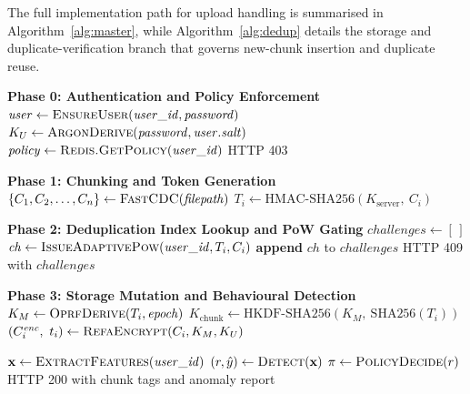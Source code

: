 \documentclass[12pt,a4paper,oneside]{report}
\newcommand{\KS}{K_{\mathrm{server}}}
\newcommand{\KM}{K_M}
\newcommand{\Kchunk}{K_{\mathrm{chunk}}}
\newcommand{\HMAC}{\mathrm{HMAC\text{-}SHA256}}
\newcommand{\HKDF}{\mathrm{HKDF\text{-}SHA256}}
\begin{document}
The full implementation path for upload handling is summarised in Algorithm~\ref{alg:master}, while Algorithm~\ref{alg:dedup} details the storage and duplicate-verification branch that governs new-chunk insertion and duplicate reuse.

\begin{algorithm}[H]
\caption{Master Upload Procedure — \textsc{SecureDedupSystem.Upload}}
\label{alg:master}
\begin{algorithmic}[1]
  \State \textbf{Phase 0: Authentication and Policy Enforcement}
  \State $\mathit{user} \gets \Call{EnsureUser}{\mathit{user\_id}, \mathit{password}}$
  \State $K_U \gets \Call{ArgonDerive}{\mathit{password}, \mathit{user.salt}}$
  \State $\mathit{policy} \gets \Call{Redis.GetPolicy}{\mathit{user\_id}}$
    \State \Return \textsc{HTTP 403}
    \State {}
  \EndIf

  \State \textbf{Phase 1: Chunking and Token Generation}
  \State $\{C_1, C_2, \ldots, C_n\} \gets \Call{FastCDC}{\mathit{filepath}}$
    \State $T_i \gets \HMAC(\KS,\ C_i)$
  \EndFor

  \State \textbf{Phase 2: Deduplication Index Lookup and PoW Gating}
  \State $\mathit{challenges} \gets [\,]$
        \State $\mathit{ch} \gets \Call{IssueAdaptivePow}{\mathit{user\_id}, T_i, C_i}$
        \State \textbf{append} $\mathit{ch}$ to $\mathit{challenges}$
      \EndIf
    \EndIf
  \EndFor
    \State \Return \textsc{HTTP 409} with $\mathit{challenges}$
  \EndIf

  \State \textbf{Phase 3: Storage Mutation and Behavioural Detection}
      \State $\KM \gets \Call{OprfDerive}{T_i, \mathit{epoch}}$
      \State $\Kchunk \gets \HKDF(\KM,\ \mathrm{SHA256}(T_i))$
      \State $(C_i^{\mathit{enc}},\ t_i) \gets \Call{RefaEncrypt}{C_i, \KM, K_U}$
      \State {}
      \State {}
      \State {}
    \Else
      \State {}
        \State {}
      \EndIf
    \EndIf
  \EndFor

  \State $\mathbf{x} \gets \Call{ExtractFeatures}{\mathit{user\_id}}$
  \State $(r, \hat{y}) \gets \Call{Detect}{\mathbf{x}}$
  \State $\pi \gets \Call{PolicyDecide}{r}$
  \State {}
  \State {}
  \State \Return \textsc{HTTP 200} with chunk tags and anomaly report
\EndProcedure
\end{algorithmic}
\end{algorithm}
\end{document}
